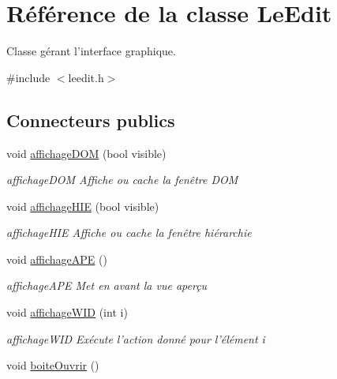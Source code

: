 \hypertarget{classLeEdit}{
\section{Référence de la classe LeEdit}
\label{classLeEdit}
}


Classe gérant l'interface graphique.  




{\ttfamily \#include $<$leedit.h$>$}

\subsection*{Connecteurs publics}
\begin{DoxyCompactItemize}
\item 
void \hyperlink{classLeEdit_a093399eb39cfb60f825ecbc6ab5ae096}{affichageDOM} (bool visible)
\begin{DoxyCompactList}\small\item\em affichageDOM Affiche ou cache la fenêtre DOM \item\end{DoxyCompactList}\item 
void \hyperlink{classLeEdit_ad4ae5c310f20d825dc582f8370f9069d}{affichageHIE} (bool visible)
\begin{DoxyCompactList}\small\item\em affichageHIE Affiche ou cache la fenêtre hiérarchie \item\end{DoxyCompactList}\item 
\hypertarget{classLeEdit_afa90a24cb83a1302a4ed9dd249e996b1}{
void \hyperlink{classLeEdit_afa90a24cb83a1302a4ed9dd249e996b1}{affichageAPE} ()}
\label{classLeEdit_afa90a24cb83a1302a4ed9dd249e996b1}

\begin{DoxyCompactList}\small\item\em affichageAPE Met en avant la vue aperçu \item\end{DoxyCompactList}\item 
void \hyperlink{classLeEdit_a7d6a5fccc38fb0edde64aa3572e8b44d}{affichageWID} (int i)
\begin{DoxyCompactList}\small\item\em affichageWID Exécute l'action donné pour l'élément i \item\end{DoxyCompactList}\item 
\hypertarget{classLeEdit_aab57d7d9a34f01848508db7e5c89af81}{
void \hyperlink{classLeEdit_aab57d7d9a34f01848508db7e5c89af81}{boiteOuvrir} ()}
\label{classLeEdit_aab57d7d9a34f01848508db7e5c89af81}


\end{DoxyCompactItemize}
